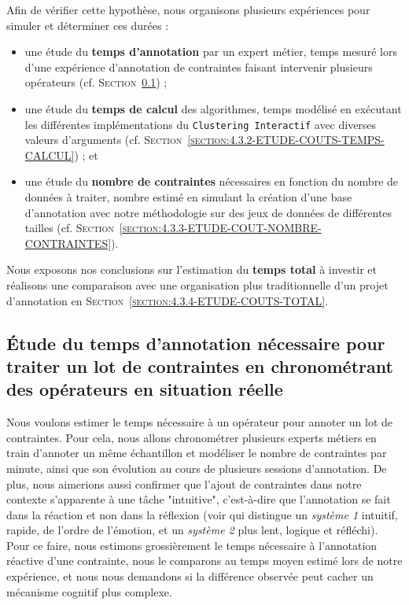 	Afin de vérifier cette hypothèse, nous organisons plusieurs expériences pour simuler et déterminer ces durées :
	\begin{itemize}
		\item une étude du \textbf{temps d'annotation} par un expert métier, temps mesuré lors d'une expérience d'annotation de contraintes faisant intervenir plusieurs opérateurs (cf. \textsc{Section~\ref{section:4.3.1-ETUDE-COUTS-TEMPS-ANNOTATION}}) ;
		\item une étude du \textbf{temps de calcul} des algorithmes, temps modélisé en exécutant les différentes implémentations du \texttt{Clustering Interactif} avec diverses valeurs d'arguments (cf. \textsc{Section~\ref{section:4.3.2-ETUDE-COUTS-TEMPS-CALCUL}}) ; et
		\item une étude du \textbf{nombre de contraintes} nécessaires en fonction du nombre de données à traiter, nombre estimé en simulant la création d'une base d'annotation avec notre méthodologie sur des jeux de données de différentes tailles (cf. \textsc{Section~\ref{section:4.3.3-ETUDE-COUT-NOMBRE-CONTRAINTES}}).
	\end{itemize}
	Nous exposons nos conclusions sur l'estimation du \textbf{temps total} à investir et réalisons une comparaison avec une organisation plus traditionnelle d'un projet d'annotation en \textsc{Section~\ref{section:4.3.4-ETUDE-COUTS-TOTAL}}.
	
	
	\subsection{Étude du temps d'annotation nécessaire pour traiter un lot de contraintes en chronométrant des opérateurs en situation réelle}
	\label{section:4.3.1-ETUDE-COUTS-TEMPS-ANNOTATION}
		
		Nous voulons estimer le temps nécessaire à un opérateur pour annoter un lot de contraintes.
		Pour cela, nous allons chronométrer plusieurs experts métiers en train d'annoter un même échantillon et modéliser le nombre de contraintes par minute, ainsi que son évolution au cours de plusieurs sessions d'annotation.
		De plus, nous aimerions aussi confirmer que l'ajout de contraintes dans notre contexte s'apparente à une tâche "intuitive", c'est-à-dire que l'annotation se fait dans la réaction et non dans la réflexion (voir \cite{kahneman:2011:thinking-fast-slow} qui distingue un \textit{système 1} intuitif, rapide, de l'ordre de l'émotion, et un \textit{système 2} plus lent, logique et réfléchi).
		Pour ce faire, nous estimons grossièrement le temps nécessaire à l'annotation réactive d'une contrainte, nous le comparons au temps moyen estimé lors de notre expérience, et nous nous demandons si la différence observée peut cacher un mécanisme cognitif plus complexe.
	
